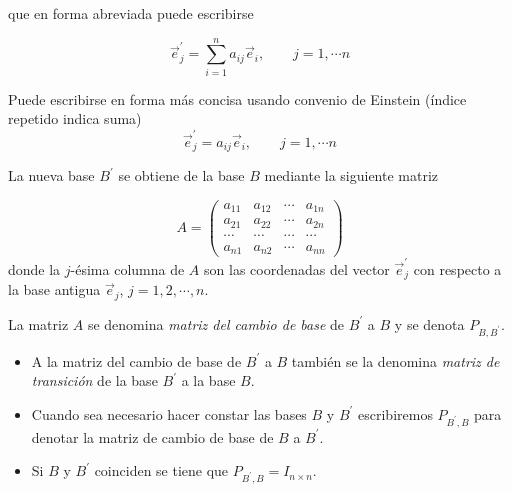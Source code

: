 \bigskip

\noindent
que en forma abreviada puede escribirse


$$\vec{e }^{\prime}_j=\sum^{n}_{i=1}a_{ij}\vec{e}_i, \qquad j=1, \cdots n$$

\begin{remark}
Puede escribirse en forma más concisa  usando convenio de Einstein (índice repetido indica suma)
$$  \vec{e }^{\prime}_j=a_{ij}\vec{e}_i, \qquad  j=1, \cdots n  $$
\end{remark}

\bigskip


La nueva  base $B ^{\prime}$   se obtiene de la base $B$ mediante la siguiente matriz 



$$A=\left(\begin{array}{cccc} a_{11} & a_{12}&  \cdots & a_{1n} \\a_{21}  & a_{22} & \cdots & a_{2n}
\\  \cdots & \cdots  &  \cdots  & \cdots \\ a_{n1} & a_{n2} & \cdots & a_{nn}
\end{array}
 \right)$$
 \bigskip
\noindent
donde la $j$-ésima columna de $A$ son las coordenadas del vector $\vec{e }^{\prime}_j$ con respecto a la base antigua $\vec{e}_j$, $j=1,2,\cdots ,n$.

\bigskip

 La matriz $A$ se denomina \textsl{matriz del cambio de base}  de   $B ^{\prime}$ a $B$ y se denota $P_{B, B^{\prime}}$.

\begin{remark}
\begin{itemize}
\item
A la matriz del cambio de base  de   $B ^{\prime}$ a  $B$ también se la denomina  \textsl{matriz de transición}  de la base   $B ^{\prime}$ a la base  $B$.
\item
 Cuando  sea necesario hacer constar las bases $B$ y $B ^{\prime}$ escribiremos $P_{B^{\prime},B}$ para denotar la matriz de cambio de base de  $B$ a $B ^{\prime}$. 

\item
Si $B$ y $B ^{\prime}$ coinciden se tiene que $P_{B ^{\prime},B}=I_{n {\times}n}$.
\end{itemize}
\end{remark}



